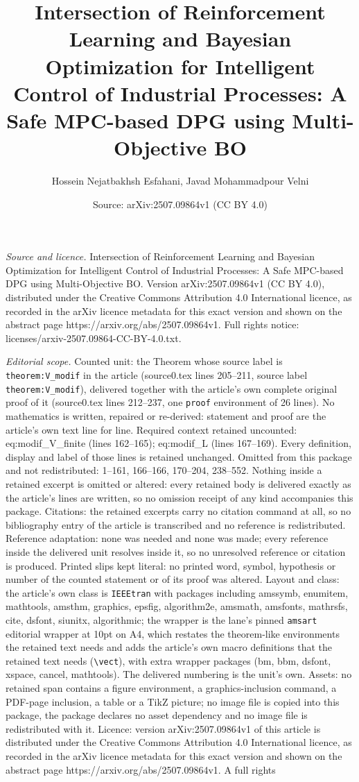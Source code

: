 \documentclass[10pt,a4paper]{amsart}
\title[Intersection of Reinforcement Learning and Bayesian Optimiza]{Intersection of Reinforcement Learning and Bayesian Optimization for Intelligent Control of Industrial Processes: A Safe MPC-based DPG using Multi-Objective BO}
\author{Hossein Nejatbakhsh Esfahani, Javad Mohammadpour Velni}
\date{Source: arXiv:2507.09864v1 (CC BY 4.0)}
\begin{document}
\maketitle

\noindent\emph{Source and licence.} Intersection of Reinforcement Learning and Bayesian Optimization for Intelligent Control of Industrial Processes: A Safe MPC-based DPG using Multi-Objective BO. Version arXiv:2507.09864v1 (CC BY 4.0), distributed under the Creative Commons Attribution 4.0 International licence, as recorded in the arXiv licence metadata for this exact version and shown on the abstract page https://arxiv.org/abs/2507.09864v1. Full rights notice: licenses/arxiv-2507.09864-CC-BY-4.0.txt.\par\smallskip

\noindent\textit{Editorial scope.} Counted unit: the Theorem whose source label is \texttt{theorem:V\_modif} in the article (source0.tex lines 205--211, source label \texttt{theorem:V\_modif}), delivered together with the article's own complete original proof of it (source0.tex lines 212--237, one \texttt{proof} environment of 26 lines). No mathematics is written, repaired or re-derived: statement and proof are the article's own text line for line. Required context retained uncounted: eq:modif\_V\_finite (lines 162--165); eq:modif\_L (lines 167--169). Every definition, display and label of those lines is retained unchanged. Omitted from this package and not redistributed: 1--161, 166--166, 170--204, 238--552. Nothing inside a retained excerpt is omitted or altered: every retained body is delivered exactly as the article's lines are written, so no omission receipt of any kind accompanies this package. Citations: the retained excerpts carry no citation command at all, so no bibliography entry of the article is transcribed and no reference is redistributed. Reference adaptation: none was needed and none was made; every reference inside the delivered unit resolves inside it, so no unresolved reference or citation is produced. Printed slips kept literal: no printed word, symbol, hypothesis or number of the counted statement or of its proof was altered. Layout and class: the article's own class is \texttt{IEEEtran} with packages including amssymb, enumitem, mathtools, amsthm, graphics, epsfig, algorithm2e, amsmath, amsfonts, mathrsfs, cite, dsfont, siunitx, algorithmic; the wrapper is the lane's pinned \texttt{amsart} editorial wrapper at 10pt on A4, which restates the theorem-like environments the retained text needs and adds the article's own macro definitions that the retained text needs (\texttt{\textbackslash vect}), with extra wrapper packages (bm, bbm, dsfont, xspace, cancel, mathtools). The delivered numbering is the unit's own. Assets: no retained span contains a figure environment, a graphics-inclusion command, a PDF-page inclusion, a table or a TikZ picture; no image file is copied into this package, the package declares no asset dependency and no image file is redistributed with it. Licence: version arXiv:2507.09864v1 of this article is distributed under the Creative Commons Attribution 4.0 International licence, as recorded in the arXiv licence metadata for this exact version and shown on the abstract page https://arxiv.org/abs/2507.09864v1. A full rights 
\end{document}
